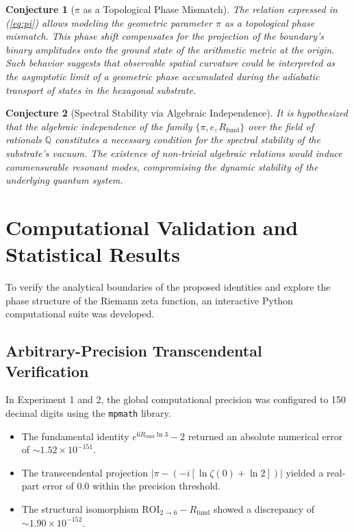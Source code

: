 \documentclass[10pt,a4paper]{article}
\newtheorem{conjecture}{Conjecture}[section]
\newcommand{\Rfund}{R_{\text{fund}}}
\begin{document}
\begin{conjecture}[\(\pi\) as a Topological Phase Mismatch]
The relation expressed in (\ref{eq:pi}) allows modeling the geometric parameter \(\pi\) as a topological phase mismatch. This phase shift compensates for the projection of the boundary's binary amplitudes onto the ground state of the arithmetic metric at the origin. Such behavior suggests that observable spatial curvature could be interpreted as the asymptotic limit of a geometric phase accumulated during the adiabatic transport of states in the hexagonal substrate.
\end{conjecture}

\begin{conjecture}[Spectral Stability via Algebraic Independence]
It is hypothesized that the algebraic independence of the family \(\{\pi, e, \Rfund\}\) over the field of rationals \(\mathbb{Q}\) constitutes a necessary condition for the spectral stability of the substrate's vacuum. The existence of non-trivial algebraic relations would induce commensurable resonant modes, compromising the dynamic stability of the underlying quantum system.
\end{conjecture}

\section{Computational Validation and Statistical Results}
\label{sec:resultados}

To verify the analytical boundaries of the proposed identities and explore the phase structure of the Riemann zeta function, an interactive Python computational suite was developed.

\subsection{Arbitrary-Precision Transcendental Verification}
In Experiment 1 and 2, the global computational precision was configured to 150 decimal digits using the \texttt{mpmath} library.
\begin{itemize}
    \item The fundamental identity \(e^{6\Rfund\ln 3} - 2\) returned an absolute numerical error of \(\sim 1.52 \times 10^{-151}\).
    \item The transcendental projection \(|\pi - (-i[\ln\zeta(0) + \ln 2])|\) yielded a real-part error of \(0.0\) within the precision threshold.
    \item The structural isomorphism \(\mathrm{ROI}_{2 \to 6} - \Rfund\) showed a discrepancy of \(\sim 1.90 \times 10^{-152}\).
\end{itemize}
\end{document}
